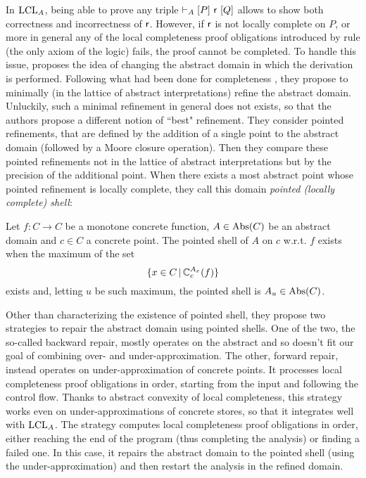 In $\text{LCL}_A$, being able to prove any triple $\vdash_{A}\nobreak[P]~\mathsf{r}~[Q]$ allows to show both correctness and incorrectness of $\mathsf{r}$. However, if $\mathsf{r}$ is not locally complete on $P$, or more in general any of the local completeness proof obligations introduced by rule  (the only axiom of the logic) fails, the proof cannot be completed.
To handle this issue, \cite{BGGR22} proposes the idea of changing the abstract domain in which the derivation is performed. Following what had been done for completeness \cite{GRS00}, they propose to minimally (in the lattice of abstract interpretations) refine the abstract domain. Unluckily, such a minimal refinement in general does not exists, so that the authors propose a different notion of ``best" refinement. They consider pointed refinements, that are defined by the addition of a single point to the abstract domain (followed by a Moore closure operation). Then they compare these pointed refinements not in the lattice of abstract interpretations but by the precision of the additional point. When there exists a most abstract point whose pointed refinement is locally complete, they call this domain \emph{pointed (locally complete) shell}:
\begin{definition}
	Let $f : C \rightarrow C$ be a monotone concrete function, $A \in \text{\normalfont Abs}(C)$ be an abstract domain and $c \in C$ a concrete point. The pointed shell of $A$ on $c$ w.r.t. $f$ exists when the maximum of the set
	\[
	\{ x \in C \,\vert\, \mathbb{C}^{A_x}_{c}(f) \}
	\]
	exists and, letting $u$ be such maximum, the pointed shell is $A_u \in \text{\normalfont Abs}(C)$.
\end{definition}

Other than characterizing the existence of pointed shell, they propose two strategies to repair the abstract domain using pointed shells. One of the two, the so-called backward repair, mostly operates on the abstract and so doesn't fit our goal of combining over- and under-approximation.
The other, forward repair, instead operates on under-approximation of concrete points. It processes local completeness proof obligations in order, starting from the input and following the control flow. Thanks to abstract convexity of local completeness, this strategy works even on under-approximations of concrete stores, so that it integrates well with $\text{LCL}_A$. The strategy computes local completeness proof obligations in order, either reaching the end of the program (thus completing the analysis) or finding a failed one. In this case, it repairs the abstract domain to the pointed shell (using the under-approximation) and then restart the analysis in the refined domain.

